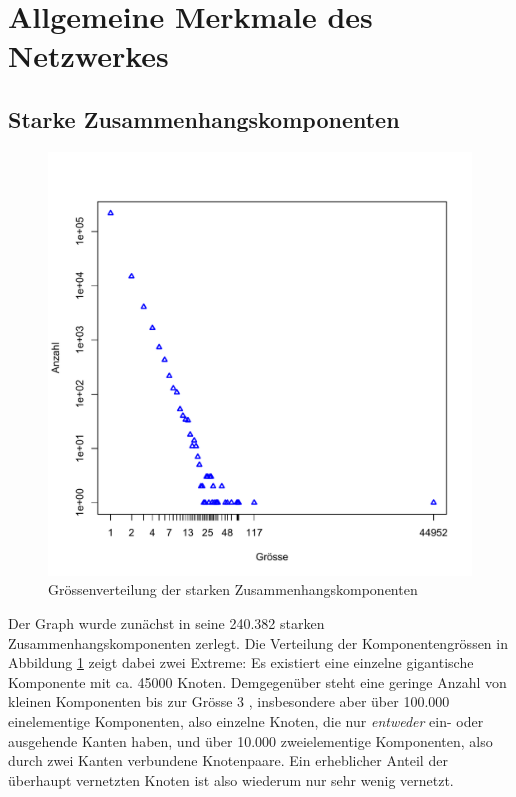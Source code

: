 \section{Allgemeine Merkmale des Netzwerkes}
\label{sec:result-allg-merkm-des}

\subsection{Starke Zusammenhangskomponenten}
\label{sec:result-komponentenstruktur}

\begin{figure}[t]
  \centering
  \includegraphics[scale=0.42]{images/component-size.pdf}
  \caption{Gr\"ossenverteilung der starken Zusammenhangskomponenten}
  \label{fig:component-size}
\end{figure}

Der Graph wurde zun\"achst in seine 240.382 starken
Zusammenhangskomponenten zerlegt. Die Verteilung der
Komponentengr\"ossen in Abbildung \ref{fig:component-size} zeigt dabei
zwei Extreme: Es existiert eine einzelne gigantische Komponente mit
ca. 45000 Knoten. Demgegen\"uber steht eine geringe Anzahl von kleinen
Komponenten bis zur Gr\"osse 3 , insbesondere aber \"uber 100.000
einelementige Komponenten, also einzelne Knoten, die nur
\emph{entweder} ein- oder ausgehende Kanten haben, und \"uber 10.000
zweielementige Komponenten, also durch zwei Kanten verbundene
Knotenpaare. Ein erheblicher Anteil der \"uberhaupt vernetzten Knoten
ist also wiederum nur sehr wenig vernetzt.

